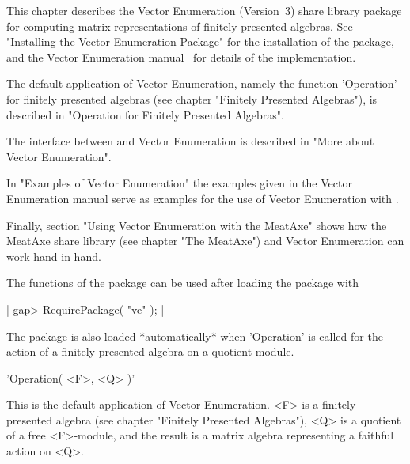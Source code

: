 \def\VE{Vector Enumeration}
\def\MeatAxe{\sf MeatAxe}

This chapter describes the {\VE} (Version~3) share library package for
computing matrix representations of finitely presented algebras.  See
"Installing the Vector Enumeration Package" for the installation of the
package, and the {\VE} manual~\cite{Lin93} for details of the
implementation.

The default application of {\VE}, namely the function 'Operation' for
finitely presented algebras (see chapter "Finitely Presented Algebras"),
is described in "Operation for Finitely Presented Algebras".

The interface between {\GAP} and {\VE} is described in "More about Vector
Enumeration".

In "Examples of Vector Enumeration" the examples given in the {\VE} manual
serve as examples for the use of {\VE} with {\GAP}.

Finally, section "Using Vector Enumeration with the MeatAxe" shows how
the {\MeatAxe} share library (see chapter "The MeatAxe") and {\VE} can work
hand in hand.

The functions of the package can be used after loading the package with

|    gap> RequirePackage( "ve" ); |

The package is also loaded *automatically* when 'Operation' is called for the
action of a finitely presented algebra on a quotient module.


'Operation( <F>, <Q> )'

This is the default application of {\VE}.
<F> is a finitely presented algebra (see chapter "Finitely Presented
Algebras"), <Q> is a quotient of a free <F>-module,
and the result is a matrix algebra representing a faithful action on <Q>.

